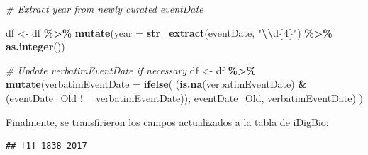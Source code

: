 \documentclass[sn-apa,pdflatex]{sn-jnl}
\newenvironment{Shaded}{\begin{snugshade}}{\end{snugshade}}
\newcommand{\AttributeTok}[1]{\textcolor[rgb]{0.13,0.29,0.53}{#1}}
\newcommand{\CommentTok}[1]{\textcolor[rgb]{0.56,0.35,0.01}{\textit{#1}}}
\newcommand{\FunctionTok}[1]{\textcolor[rgb]{0.13,0.29,0.53}{\textbf{#1}}}
\newcommand{\NormalTok}[1]{#1}
\newcommand{\OtherTok}[1]{\textcolor[rgb]{0.56,0.35,0.01}{#1}}
\newcommand{\SpecialCharTok}[1]{\textcolor[rgb]{0.81,0.36,0.00}{\textbf{#1}}}
\newcommand{\StringTok}[1]{\textcolor[rgb]{0.31,0.60,0.02}{#1}}
\begin{document}
\begin{Shaded}
\begin{Highlighting}[]
\CommentTok{\# Extract year from newly curated eventDate}

\NormalTok{df }\OtherTok{\textless{}{-}}\NormalTok{ df }\SpecialCharTok{\%\textgreater{}\%} \FunctionTok{mutate}\NormalTok{(}\AttributeTok{year =} \FunctionTok{str\_extract}\NormalTok{(eventDate, }\StringTok{"}\SpecialCharTok{\textbackslash{}\textbackslash{}}\StringTok{d\{4\}"}\NormalTok{) }\SpecialCharTok{\%\textgreater{}\%} \FunctionTok{as.integer}\NormalTok{())}

\CommentTok{\# Update verbatimEventDate if necessary}
\NormalTok{df }\OtherTok{\textless{}{-}}\NormalTok{ df }\SpecialCharTok{\%\textgreater{}\%} \FunctionTok{mutate}\NormalTok{(}\AttributeTok{verbatimEventDate =} \FunctionTok{ifelse}\NormalTok{(}
\NormalTok{  (}\FunctionTok{is.na}\NormalTok{(verbatimEventDate) }\SpecialCharTok{\&}\NormalTok{ (eventDate\_Old }\SpecialCharTok{!=}\NormalTok{ verbatimEventDate)),}
\NormalTok{  eventDate\_Old, verbatimEventDate) )}
\end{Highlighting}
\end{Shaded}

Finalmente, se transfirieron los campos actualizados a la tabla de
iDigBio:

\begin{Shaded}
\end{Shaded}

\begin{verbatim}
## [1] 1838 2017
\end{verbatim}

\begin{Shaded}
\end{Shaded}
\end{document}
